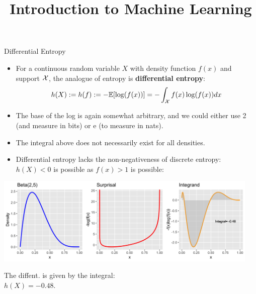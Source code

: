 \documentclass[11pt,compress,t,notes=noshow, xcolor=table]{beamer}
\title{Introduction to Machine Learning}
\date{}
\begin{document}

\begin{vbframe}{Differential Entropy} 
  \begin{itemize}
    \item For a continuous random variable $X$ with density function $f(x)$ and support $\mathcal{X}$, the analogue of entropy is \textbf{differential entropy}:
    \small{
    $$ h(X) := h(f) := - \mathbb{E}[\log(f(x))]= - \int_{\mathcal{X}} f(x) \log(f(x)) dx $$}
    \item The base of the log is again somewhat arbitrary, and we could either use 2 (and measure in bits) or e (to measure in nats).
    \item The integral above does not necessarily exist for all densities.
    \item Differential entropy lacks the non-negativeness of discrete entropy: $h(X) < 0$ is possible as $f(x) > 1$ is possible:
    \end{itemize}
\begin{minipage}{0.8\textwidth}
    \begin{center}
    \includegraphics[width = 0.95\textwidth]{figure/beta_entropy.png}
    \end{center}
\end{minipage}%
\begin{minipage}{0.2\textwidth}
  \scriptsize{The diffent. is given by the integral:\\ $h(X)=-0.48$.}
\end{minipage}
\end{vbframe}
\end{document}
